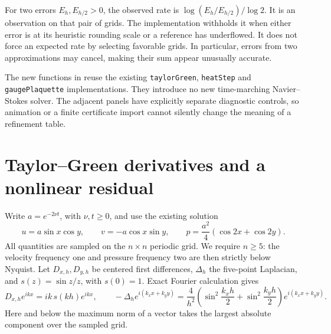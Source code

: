 For two errors $E_h,E_{h/2}>0$, the observed rate is
$\log(E_h/E_{h/2})/\log2$. It is an observation on that pair of grids.
The implementation withholds it when either error is at its heuristic
rounding scale or a reference has underflowed. It does not force an expected
rate by selecting favorable grids. In particular, errors from two
approximations may cancel, making their sum appear unusually accurate.

The new functions in 
reuse the existing \texttt{taylorGreen}, \texttt{heatStep} and
\texttt{gaugePlaquette} implementations. They introduce no new time-marching
Navier--Stokes solver. The adjacent panels have explicitly separate
diagnostic controls, so animation or a finite certificate import cannot
silently change the meaning of a refinement table.

\section{Taylor--Green derivatives and a nonlinear residual}

Write $a=e^{-2\nu t}$, with $\nu,t\ge0$, and use the existing solution
\[
 u=a\sin x\cos y,\qquad v=-a\cos x\sin y,\qquad
 p=\frac{a^2}{4}(\cos2x+\cos2y).
\]
All quantities are sampled on the $n\times n$ periodic grid. We require
$n\ge5$: the velocity frequency one and pressure frequency two are then
strictly below Nyquist. Let $D_{x,h},D_{y,h}$ be centered first differences,
$\Delta_h$ the five-point Laplacian, and
$s(z)=\sin z/z$, with $s(0)=1$. Exact Fourier calculation gives
\[
 D_{x,h}e^{ikx}=ik\,s(kh)e^{ikx},\qquad
 -\Delta_he^{i(k_xx+k_yy)}
 =\frac4{h^2}\left(\sin^2\frac{k_xh}{2}
                   +\sin^2\frac{k_yh}{2}\right)e^{i(k_xx+k_yy)}.
\]
Here and below the maximum norm of a vector takes the largest absolute
component over the sampled grid.

